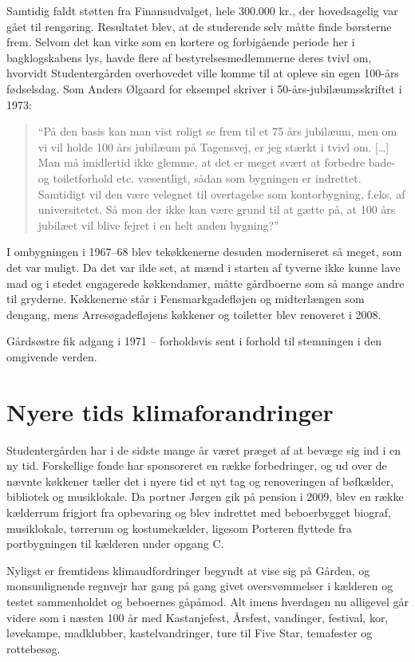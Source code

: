\documentclass[11pt,article,twoside,openany,danish,extrafontsizes]{memoir} %
\begin{document}
Samtidig faldt støtten fra Finansudvalget, hele 300.000 kr., der hovedsagelig var gået til rengøring. Resultatet blev, at de studerende selv måtte finde børsterne frem. Selvom det kan virke som en kortere og forbigående periode her i bagklogskabens lys, havde flere af bestyrelsesmedlemmerne deres tvivl om, hvorvidt Studentergården overhovedet ville komme til at opleve sin egen 100-års fødselsdag. Som Anders Ølgaard for eksempel skriver i 50-års-jubilæumsskriftet i 1973:
\begin{quote} \small
\enquote{På den basis kan man vist roligt se frem til et 75 års jubilæum, men om vi vil holde 100 års jubilæum på Tagensvej, er jeg stærkt i tvivl om. [\dots] Man må imidlertid ikke glemme, at det er meget svært at forbedre bade- og toiletforhold etc. væsentligt, sådan som bygningen er indrettet. Samtidigt vil den være velegnet til overtagelse som kontorbygning, f.eks. af universitetet. Så mon der ikke kan være grund til at gætte på, at 100 års jubilæet vil blive fejret i en helt anden bygning?}
\end{quote}
I ombygningen i 1967--68 blev tekøkkenerne desuden moderniseret så meget, som det var muligt. Da det var ilde set, at mænd i starten af tyverne ikke kunne lave mad og i stedet engagerede køkkendamer, måtte gårdboerne som så mange andre til gryderne. Køkkenerne står i Fensmarkgadefløjen og midterlængen som dengang, mens Arresøgadefløjens køkkener og toiletter blev renoveret i 2008.

Gårdsøstre fik adgang i 1971 -- forholdsvis sent i forhold til stemningen i den omgivende verden.

\section{Nyere tids klimaforandringer}
Studentergården har i de sidste mange år været præget af at bevæge sig ind i en ny tid. Forskellige fonde har sponsoreret en række forbedringer, og ud over de nævnte køkkener tæller det i nyere tid et nyt tag og renoveringen af bøfkælder, bibliotek og musiklokale. Da portner Jørgen gik på pension i 2009, blev en række kælderrum frigjort fra opbevaring og blev indrettet med beboerbygget biograf, musiklokale, tørrerum og kostumekælder, ligesom Porteren flyttede fra portbygningen til kælderen under opgang C.

Nyligst er fremtidens klimaudfordringer begyndt at vise sig på Gården, og monsunlignende regnvejr har gang på gang givet oversvømmelser i kælderen og testet sammenholdet og beboernes gåpåmod. Alt imens hverdagen nu alligevel går videre som i næsten 100 år med Kastanjefest, Årsfest, vandinger, festival, kor, løvekampe, madklubber, kastelvandringer, ture til Five Star, temafester og rottebesøg.
\end{document}
